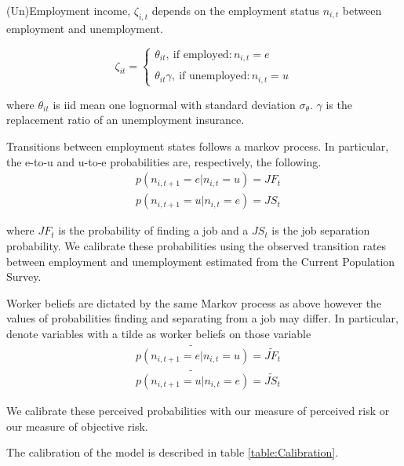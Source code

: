 (Un)Employment income, $\zeta_{i,t}$ depends on the employment status $n_{i,t}$ between employment and unemployment.   

$$
\zeta _{it} =
\begin{cases}
\theta_{it} , \  \text{if employed}  : n_{i,t}=e\\ \\
\theta_{it}\gamma, \  \text{if unemployed}: n_{i,t}=u  %
\end{cases}
$$ 

where $\theta_{it}$ is iid mean one lognormal with standard deviation $\sigma_\theta$. 
$\gamma$ is the replacement ratio of an unemployment insurance. 

Transitions between employment states follows a markov process. In particular, the e-to-u and u-to-e probabilities are, respectively, the following. 
\begin{align*}
 & p(n_{i,t+1}=e|n_{i,t}=u) = JF_{t} \\
& p(n_{i,t+1}=u|n_{i,t}=e) = JS_{t}
\end{align*}

where $JF_{t}$ is the probability of finding a job and a $JS_{t}$ is the job separation probability. We calibrate these probabilities using the observed transition rates between employment and unemployment estimated from the Current Population Survey.

Worker beliefs are dictated by the same Markov process as above however the values of probabilities finding and separating from a job may differ. In particular, denote variables with a tilde as worker beliefs on those variable
\begin{align*}
 & \tilde{p(n_{i,t+1}=e|n_{i,t}=u)} = \tilde{JF_{t}} \\
& \tilde{p(n_{i,t+1}=u|n_{i,t}=e)} = \tilde{JS_{t}}
\end{align*}

We calibrate these perceived probabilities with our measure of perceived risk or our measure of objective risk.



The calibration of the model is described in table \ref{table:Calibration}.

